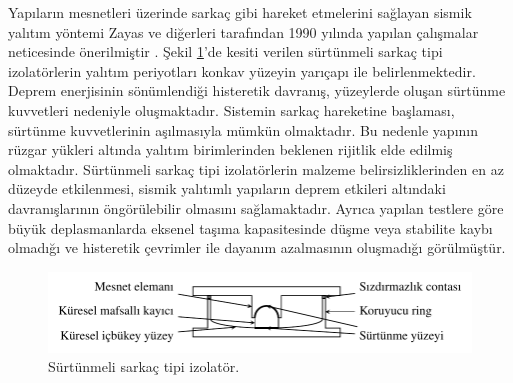 Yapıların mesnetleri üzerinde sarkaç gibi hareket etmelerini sağlayan
sismik yalıtım yöntemi Zayas ve diğerleri tarafından 1990 yılında
yapılan çalışmalar neticesinde önerilmiştir \cite{doi:10.1193/1.1585573}.
Şekil \ref{fig:FPIsolator}'de kesiti verilen sürtünmeli sarkaç tipi
izolatörlerin yalıtım periyotları konkav yüzeyin yarıçapı ile belirlenmektedir.
Deprem enerjisinin sönümlendiği histeretik davranış, yüzeylerde oluşan
sürtünme kuvvetleri nedeniyle oluşmaktadır. Sistemin sarkaç hareketine
başlaması, sürtünme kuvvetlerinin aşılmasıyla mümkün olmaktadır. Bu
nedenle yapının rüzgar yükleri altında yalıtım birimlerinden beklenen
rijitlik elde edilmiş olmaktadır. Sürtünmeli sarkaç tipi izolatörlerin
malzeme belirsizliklerinden en az düzeyde etkilenmesi, sismik yalıtımlı
yapıların deprem etkileri altındaki davranışlarının öngörülebilir
olmasını sağlamaktadır. Ayrıca yapılan testlere göre büyük deplasmanlarda
eksenel taşıma kapasitesinde düşme veya stabilite kaybı olmadığı ve
histeretik çevrimler ile dayanım azalmasının oluşmadığı görülmüştür.
\begin{figure}[h!]
\centering{}\includegraphics{TikZ/FPIsolator} \caption{\label{fig:FPIsolator}Sürtünmeli sarkaç tipi izolatör.}
 
\end{figure}

